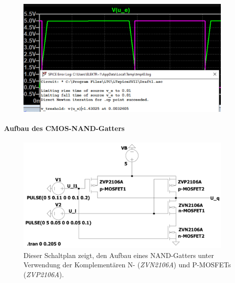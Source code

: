 \documentclass[12pt,english,ngerman]{scrartcl}
\begin{document}
\begin{figure}[H]
  \centering
    \includegraphics[width=0.95\textwidth]{./simdaten_lab/cmos/inverter/treshold.png}
    \caption{}
  \label{fig:sim_inv_threshold}
\end{figure}
\paragraph{Aufbau des CMOS-NAND-Gatters}

\begin{figure}[H]
  \centering
    \includegraphics[width=0.95\textwidth]{./simdaten_lab/cmos/nand/schaltung.png}
  \caption{Dieser Schaltplan zeigt, den Aufbau eines NAND-Gatters unter
    Verwendung der Komplementären N- (\textit{ZVN2106A}) und P-MOSFETs
    (\textit{ZVP2106A}).}
  \label{fig:sim_aufbau_nand}
\end{figure}

\end{document}
